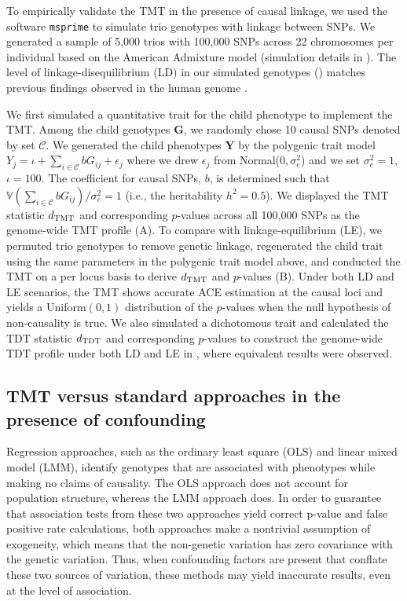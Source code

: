 \documentclass[12pt]{extarticle}
\newcommand{\tmt}{{\normalfont \text{TMT}}}
\newcommand{\tdt}{{\normalfont \text{TDT}}}
\newcommand{\V}{\mathbb{V}}
\newcommand{\cC}{\mathcal{C}}
\begin{document}
{To empirically validate the TMT in the presence of causal linkage, we used the software \texttt{msprime} \citep{baumdicker2022} to simulate trio genotypes with linkage between SNPs. We generated a sample of 5,000 trios with 100,000 SNPs across 22 chromosomes per individual based on the American Admixture model \citep{browning2018} (simulation details in ). The level of linkage-disequilibrium (LD) in our simulated genotypes () matches previous findings observed in the human genome \citep{reich2001, dawson2002}. 

We first simulated a quantitative trait for the child phenotype to implement the TMT. Among the child genotypes $\boldsymbol{G}$, we randomly chose 10 causal SNPs denoted by set $\cC$. We generated the child phenotypes $\boldsymbol{Y}$ by the polygenic trait model $Y_j=\iota + \sum_{i\in \cC}bG_{ij} + \epsilon_j$ where we drew $\epsilon_j$ from Normal($0,\sigma^2_e$) and we set $\sigma^2_e=1$, $\iota=100$. The coefficient for causal SNPs, $b$, is determined such that $\V(\sum_{i\in \cC}bG_{ij})/\sigma^2_e=1$ (i.e., the heritability $h^2=0.5$). We displayed the TMT statistic $d_{\tmt}$ and corresponding $p$-values across all 100,000 SNPs as the genome-wide TMT profile (A). To compare with linkage-equilibrium (LE), we permuted trio genotypes to remove genetic linkage, regenerated the child trait using the same parameters in the polygenic trait model above, and conducted the TMT on a per locus basis to derive $d_{\tmt}$ and $p$-values (B). Under both LD and LE scenarios, the TMT shows accurate ACE estimation at the causal loci and yields a Uniform$(0,1)$ distribution of the $p$-values when the null hypothesis of non-causality is true. We also simulated a dichotomous trait and calculated the TDT statistic $d_{\tdt}$ and corresponding $p$-values to construct the genome-wide TDT profile under both LD and LE in , where equivalent results were observed.


\subsection{TMT versus standard approaches in the presence of confounding}

Regression approaches, such as the ordinary least square (OLS) and linear mixed model (LMM), identify genotypes that are associated with phenotypes while making no claims of causality. The OLS approach does not account for population structure, whereas the LMM approach does. In order to guarantee that association tests from these two approaches yield correct p-value and false positive rate calculations, both approaches make a nontrivial assumption of exogeneity, which means that the non-genetic variation has zero covariance with the genetic variation. Thus, when confounding factors are present that conflate these two sources of variation, these methods may yield inaccurate results, even at the level of association. 

}
\end{document}
